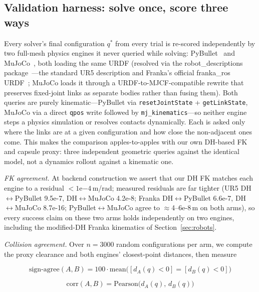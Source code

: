 \documentclass[10pt,conference]{IEEEtran}
\begin{document}
\subsection{Validation harness: solve once, score three ways}
\label{sec:harness}

Every solver's final configuration $q^{*}$ from every trial is re-scored
independently by two full-mesh physics engines it never queried while solving:
PyBullet~\cite{b45} and MuJoCo~\cite{b46}, both loading the same URDF (resolved
via the robot\_descriptions package~\cite{b47}---the standard UR5 description and
Franka's official franka\_ros URDF~\cite{b43}; MuJoCo loads it through a
URDF-to-MJCF-compatible rewrite that preserves fixed-joint links as separate
bodies rather than fusing them). Both queries are purely kinematic---PyBullet via
\texttt{resetJointState} + \texttt{getLinkState}, MuJoCo via a direct
\texttt{qpos} write followed by \texttt{mj\_kinematics}---so neither engine steps
a physics simulation or resolves contacts dynamically. Each is asked only where
the links are at a given configuration and how close the non-adjacent ones come.
This makes the comparison apples-to-apples with our own DH-based FK and capsule
proxy: three independent geometric queries against the identical model, not a
dynamics rollout against a kinematic one.

\emph{FK agreement.} At backend construction we assert that our DH FK matches
each engine to a residual $< 1\mathrm{e}{-4}$\,m/rad; measured residuals are far
tighter (UR5 DH$\leftrightarrow$PyBullet 9.5e-7, DH$\leftrightarrow$MuJoCo
4.2e-8; Franka DH$\leftrightarrow$PyBullet 6.6e-7, DH$\leftrightarrow$MuJoCo
8.7e-16; PyBullet$\leftrightarrow$MuJoCo agree to $\approx$4--6e-8\,m on both
arms), so every success claim on these two arms holds independently on two
engines, including the modified-DH Franka kinematics of Section~\ref{sec:robots}.

\emph{Collision agreement.} Over $n = 3000$ random configurations per arm, we
compute the proxy clearance and both engines' closest-point distances, then
measure

\begin{equation}
\text{sign-agree}(A, B) = 100 \cdot
\mathrm{mean}\big( [d_A(q) < 0] = [d_B(q) < 0] \big)
\label{eq:signagree}
\end{equation}

\begin{equation}
\mathrm{corr}(A, B) = \mathrm{Pearson}\big( d_A(q),\, d_B(q) \big)
\label{eq:corr}
\end{equation}
\end{document}
